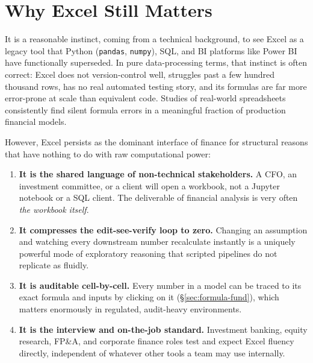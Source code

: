 \documentclass[11pt,a4paper]{article}
\begin{document}
\section{Why Excel Still Matters}

It is a reasonable instinct, coming from a technical background, to see Excel as a legacy tool that Python (\texttt{pandas}, \texttt{numpy}), SQL, and BI platforms like Power BI have functionally superseded. In pure data-processing terms, that instinct is often correct: Excel does not version-control well, struggles past a few hundred thousand rows, has no real automated testing story, and its formulas are far more error-prone at scale than equivalent code. Studies of real-world spreadsheets consistently find silent formula errors in a meaningful fraction of production financial models.

However, Excel persists as the dominant interface of finance for structural reasons that have nothing to do with raw computational power:

\begin{enumerate}
  \item \textbf{It is the shared language of non-technical stakeholders.} A CFO, an investment committee, or a client will open a workbook, not a Jupyter notebook or a SQL client. The deliverable of financial analysis is very often \emph{the workbook itself}.
  \item \textbf{It compresses the edit-see-verify loop to zero.} Changing an assumption and watching every downstream number recalculate instantly is a uniquely powerful mode of exploratory reasoning that scripted pipelines do not replicate as fluidly.
  \item \textbf{It is auditable cell-by-cell.} Every number in a model can be traced to its exact formula and inputs by clicking on it (\S\ref{sec:formula-fund}), which matters enormously in regulated, audit-heavy environments.
  \item \textbf{It is the interview and on-the-job standard.} Investment banking, equity research, FP\&A, and corporate finance roles test and expect Excel fluency directly, independent of whatever other tools a team may use internally.
\end{enumerate}
\end{document}
